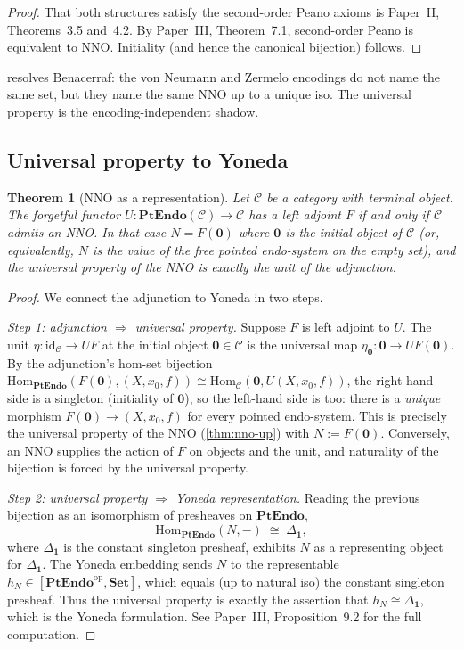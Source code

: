 \documentclass[12pt]{article}
\newtheorem{theorem}{Theorem}[section]
\theoremstyle{definition}
\theoremstyle{remark}
\newcommand{\Set}{\mathbf{Set}}
\newcommand{\PtEndo}{\mathbf{PtEndo}}
\newcommand{\op}{^{\mathrm{op}}}
\newcommand{\id}{\mathrm{id}}
\newcommand{\Hom}{\mathrm{Hom}}
\newcommand{\iso}{\cong}
\begin{document}
\begin{proof}
That both structures satisfy the second-order Peano axioms is Paper~II,
Theorems~3.5 and~4.2. By Paper~III, Theorem~7.1, second-order Peano is
equivalent to NNO. Initiality (and hence the canonical bijection) follows.
\end{proof}

 resolves Benacerraf: the von Neumann and Zermelo
encodings do not name the same set, but they name the same NNO up to a
unique iso. The universal property is the encoding-independent shadow.

\subsection{Universal property to Yoneda}
\label{sec:transit-iii}

\begin{theorem}[NNO as a representation]
\label{thm:transit-iii}
Let $\mathcal{C}$ be a category with terminal object. The forgetful
functor $U\colon \PtEndo(\mathcal{C}) \to \mathcal{C}$ has a left adjoint
$F$ if and only if $\mathcal{C}$ admits an NNO. In that case
$N = F(\mathbf{0})$ where $\mathbf{0}$ is the initial object of
$\mathcal{C}$ (or, equivalently, $N$ is the value of the free pointed
endo-system on the empty set), and the universal property of the NNO is
exactly the unit of the adjunction.
\end{theorem}

\begin{proof}
We connect the adjunction to Yoneda in two steps.

\emph{Step 1: adjunction $\Rightarrow$ universal property.} Suppose $F$
is left adjoint to $U$. The unit $\eta\colon \id_\mathcal{C} \to U F$ at the
initial object $\mathbf{0} \in \mathcal{C}$ is the universal map
$\eta_\mathbf{0}\colon \mathbf{0} \to U F (\mathbf{0})$. By the
adjunction's hom-set bijection
$\Hom_{\PtEndo}(F(\mathbf{0}), (X, x_0, f)) \iso \Hom_\mathcal{C}(\mathbf{0}, U(X, x_0, f))$,
the right-hand side is a singleton (initiality of $\mathbf{0}$), so the
left-hand side is too: there is a \emph{unique} morphism
$F(\mathbf{0}) \to (X, x_0, f)$ for every pointed endo-system. This is
precisely the universal property of the NNO (\cref{thm:nno-up}) with
$N := F(\mathbf{0})$. Conversely, an NNO supplies the action of $F$ on
objects and the unit, and naturality of the bijection is forced by the
universal property.

\emph{Step 2: universal property $\Rightarrow$ Yoneda representation.}
Reading the previous bijection as an isomorphism of presheaves on
$\PtEndo$,
\[
\Hom_{\PtEndo}(N, -) \;\iso\; \Delta_{\mathbf{1}},
\]
where $\Delta_{\mathbf{1}}$ is the constant singleton presheaf, exhibits
$N$ as a representing object for $\Delta_{\mathbf{1}}$. The Yoneda
embedding sends $N$ to the representable $h_N \in [\PtEndo\op, \Set]$,
which equals (up to natural iso) the constant singleton presheaf. Thus
the universal property is exactly the assertion that $h_N \iso \Delta_{\mathbf{1}}$,
which is the Yoneda formulation. See Paper~III, Proposition~9.2 for the
full computation.
\end{proof}
\end{document}
